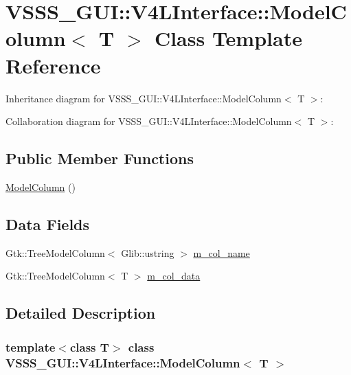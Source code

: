 \hypertarget{class_v_s_s_s___g_u_i_1_1_v4_l_interface_1_1_model_column}{}\section{V\+S\+S\+S\+\_\+\+G\+UI\+:\+:V4\+L\+Interface\+:\+:Model\+Column$<$ T $>$ Class Template Reference}
\label{class_v_s_s_s___g_u_i_1_1_v4_l_interface_1_1_model_column}


Inheritance diagram for V\+S\+S\+S\+\_\+\+G\+UI\+:\+:V4\+L\+Interface\+:\+:Model\+Column$<$ T $>$\+:


Collaboration diagram for V\+S\+S\+S\+\_\+\+G\+UI\+:\+:V4\+L\+Interface\+:\+:Model\+Column$<$ T $>$\+:
\subsection*{Public Member Functions}
\begin{DoxyCompactItemize}
\item 
\hyperlink{class_v_s_s_s___g_u_i_1_1_v4_l_interface_1_1_model_column_a4854fcf5e2e9a5c6946e076e6a757bd2}{Model\+Column} ()
\end{DoxyCompactItemize}
\subsection*{Data Fields}
\begin{DoxyCompactItemize}
\item 
Gtk\+::\+Tree\+Model\+Column$<$ Glib\+::ustring $>$ \hyperlink{class_v_s_s_s___g_u_i_1_1_v4_l_interface_1_1_model_column_a96d5f652d19a139a1380d9ffc0110ed0}{m\+\_\+col\+\_\+name}
\item 
Gtk\+::\+Tree\+Model\+Column$<$ T $>$ \hyperlink{class_v_s_s_s___g_u_i_1_1_v4_l_interface_1_1_model_column_aa6720e1b3e47adb85d36c3ec3a2bb262}{m\+\_\+col\+\_\+data}
\end{DoxyCompactItemize}


\subsection{Detailed Description}
\subsubsection*{template$<$class T$>$\newline
class V\+S\+S\+S\+\_\+\+G\+U\+I\+::\+V4\+L\+Interface\+::\+Model\+Column$<$ T $>$}



